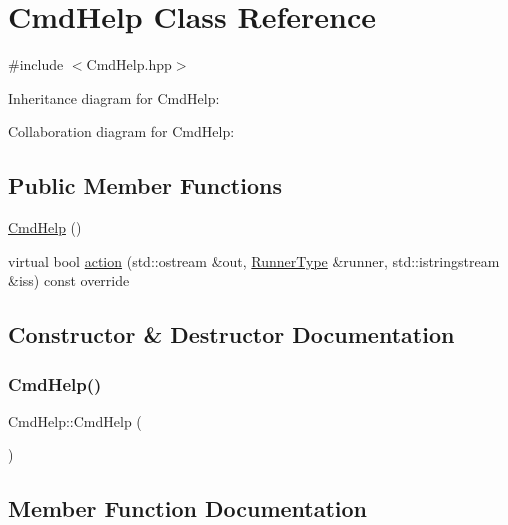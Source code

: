 \hypertarget{classCmdHelp}{}\section{Cmd\+Help Class Reference}
\label{classCmdHelp}


{\ttfamily \#include $<$Cmd\+Help.\+hpp$>$}



Inheritance diagram for Cmd\+Help\+:


Collaboration diagram for Cmd\+Help\+:
\subsection*{Public Member Functions}
\begin{DoxyCompactItemize}
\item 
\hyperlink{classCmdHelp_a2c31488db208acdb2b30cc7bb561a69c}{Cmd\+Help} ()
\item 
virtual bool \hyperlink{classCmdHelp_adae5afd78e75a73735d0ced85b5604a5}{action} (std\+::ostream \&out, \hyperlink{Command_8hpp_a3594ceaf3c835811a9a67810e7af19f9}{Runner\+Type} \&runner, std\+::istringstream \&iss) const override
\end{DoxyCompactItemize}


\subsection{Constructor \& Destructor Documentation}
\mbox{\label{classCmdHelp_a2c31488db208acdb2b30cc7bb561a69c}} 
\subsubsection{\texorpdfstring{Cmd\+Help()}{CmdHelp()}}
{\footnotesize\ttfamily Cmd\+Help\+::\+Cmd\+Help (\begin{DoxyParamCaption}{ }\end{DoxyParamCaption})}



\subsection{Member Function Documentation}
\mbox{\label{classCmdHelp_adae5afd78e75a73735d0ced85b5604a5}} 
